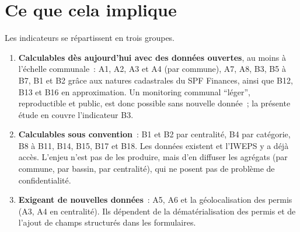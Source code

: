 \documentclass[11pt,a4paper]{report}
\begin{document}
\section{Ce que cela implique}
Les indicateurs se répartissent en trois groupes.
\begin{enumerate}
\item \textbf{Calculables dès aujourd'hui avec des données ouvertes}, au moins à l'échelle communale~: A1, A2, A3 et A4 (par commune), A7, A8, B3, B5 à B7, B1 et B2 grâce aux natures cadastrales du SPF Finances, ainsi que B12, B13 et B16 en approximation. Un monitoring communal \enquote{léger}, reproductible et public, est donc possible sans nouvelle donnée~; la présente étude en couvre l'indicateur B3.
\item \textbf{Calculables sous convention}~: B1 et B2 par centralité, B4 par catégorie, B8 à B11, B14, B15, B17 et B18. Les données existent et l'IWEPS y a déjà accès. L'enjeu n'est pas de les produire, mais d'en diffuser les agrégats (par commune, par bassin, par centralité), qui ne posent pas de problème de confidentialité.
\item \textbf{Exigeant de nouvelles données}~: A5, A6 et la géolocalisation des permis (A3, A4 en centralité). Ils dépendent de la dématérialisation des permis et de l'ajout de champs structurés dans les formulaires.
\end{enumerate}
\end{document}

